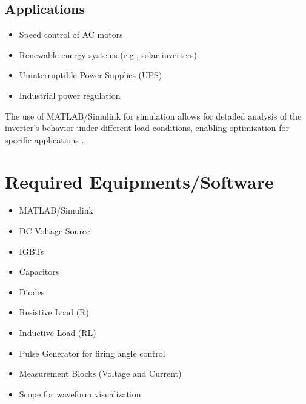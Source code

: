 \documentclass[12pt]{article}
\begin{document}
\subsection*{Applications}
\begin{itemize}
    \item Speed control of AC motors
    \item Renewable energy systems (e.g., solar inverters)
    \item Uninterruptible Power Supplies (UPS)
    \item Industrial power regulation
\end{itemize}

The use of MATLAB/Simulink for simulation allows for detailed analysis of the inverter's behavior under different load conditions, enabling optimization for specific applications \cite{mathworks2023simulink}.


\section*{Required Equipments/Software}
\begin{itemize}
    \item MATLAB/Simulink
    \item DC Voltage Source
    \item IGBTs
    \item Capacitors
    \item Diodes
    \item Resistive Load (R)
    \item Inductive Load (RL)
    \item Pulse Generator for firing angle control
    \item Measurement Blocks (Voltage and Current)
    \item Scope for waveform visualization
\end{itemize}
\end{document}

